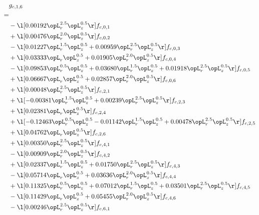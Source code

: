 \begin{alignat}{2} 
\label{eq:g_16_0} 
& g_{c,1,6} \nonumber \\ 
 = \\ 
& - \l[  0.00192 \opL_r^{2.5} \opL_z^{0.5}  \r] f_{c,0,1} \nonumber \\ 
& + \l[  0.00476 \opL_r^{2.0} \opL_z^{0.5}  \r] f_{c,0,2} \nonumber \\ 
& - \l[  0.01227 \opL_r^{1.5} \opL_z^{0.5} +  0.00959 \opL_r^{2.5} \opL_z^{0.5}  \r] f_{c,0,3} \nonumber \\ 
& + \l[  0.03333 \opL_r \opL_z^{0.5} +  0.01905 \opL_r^{2.0} \opL_z^{0.5}  \r] f_{c,0,4} \nonumber \\ 
& - \l[  0.09853 \opL_r^{0.5} \opL_z^{0.5} +  0.03680 \opL_r^{1.5} \opL_z^{0.5} +  0.01918 \opL_r^{2.5} \opL_z^{0.5}  \r] f_{c,0,5} \nonumber \\ 
& + \l[  0.06667 \opL_r \opL_z^{0.5} +  0.02857 \opL_r^{2.0} \opL_z^{0.5}  \r] f_{c,0,6} \nonumber \\ 
& + \l[  0.00048 \opL_r^{2.5} \opL_z^{0.5}  \r] f_{c,2,1} \nonumber \\ 
& + \l[  -0.00381 \opL_r^{1.5} \opL_z^{0.5} +  0.00239 \opL_r^{2.5} \opL_z^{0.5}  \r] f_{c,2,3} \nonumber \\ 
& + \l[  0.02381 \opL_r \opL_z^{0.5}  \r] f_{c,2,4} \nonumber \\ 
& + \l[  -0.12463 \opL_r^{0.5} \opL_z^{0.5}   -0.01142 \opL_r^{1.5} \opL_z^{0.5} +  0.00478 \opL_r^{2.5} \opL_z^{0.5}  \r] f_{c,2,5} \nonumber \\ 
& + \l[  0.04762 \opL_r \opL_z^{0.5}  \r] f_{c,2,6} \nonumber \\ 
& + \l[  0.00350 \opL_r^{2.5} \opL_z^{0.5}  \r] f_{c,4,1} \nonumber \\ 
& - \l[  0.00909 \opL_r^{2.0} \opL_z^{0.5}  \r] f_{c,4,2} \nonumber \\ 
& + \l[  0.02337 \opL_r^{1.5} \opL_z^{0.5} +  0.01750 \opL_r^{2.5} \opL_z^{0.5}  \r] f_{c,4,3} \nonumber \\ 
& - \l[  0.05714 \opL_r \opL_z^{0.5} +  0.03636 \opL_r^{2.0} \opL_z^{0.5}  \r] f_{c,4,4} \nonumber \\ 
& + \l[  0.11325 \opL_r^{0.5} \opL_z^{0.5} +  0.07012 \opL_r^{1.5} \opL_z^{0.5} +  0.03501 \opL_r^{2.5} \opL_z^{0.5}  \r] f_{c,4,5} \nonumber \\ 
& - \l[  0.11429 \opL_r \opL_z^{0.5} +  0.05455 \opL_r^{2.0} \opL_z^{0.5}  \r] f_{c,4,6} \nonumber \\ 
& - \l[  0.00246 \opL_r^{2.5} \opL_z^{0.5}  \r] f_{c,6,1} \nonumber \\ 

\end{alignat}
